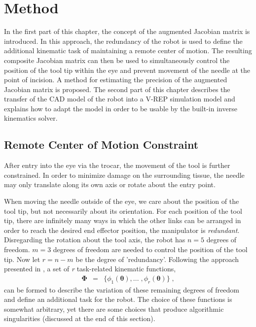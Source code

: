 \chapter{Method}
In the first part of this chapter, the concept of the augmented Jacobian matrix is introduced. In this approach, the redundancy of the robot is used to define the additional kinematic task of maintaining a remote center of motion. The resulting composite Jacobian matrix can then be used to simultaneously control the position of the tool tip within the eye and prevent movement of the needle at the point of incision. A method for estimating the precision of the augmented Jacobian matrix is proposed. The second part of this chapter describes the transfer of the CAD model of the robot into a V-REP simulation model and explains how to adapt the model in order to be usable by the built-in inverse kinematics solver. 

\section{Remote Center of Motion Constraint}
After entry into the eye via the trocar, the movement of the tool is further constrained. In order to minimize damage on the surrounding tissue, the needle may only translate along its own axis or rotate about the entry point.

When moving the needle outside of the eye, we care about the position of the tool tip, but not necessarily about its orientation. For each position of the tool tip, there are infinitely many ways in which the other links can be arranged in order to reach the desired end effector position, the manipulator is \textit{redundant}.
Disregarding the rotation about the tool axis, the robot has $n=5$ degrees of freedom. $m=3$ degrees of freedom are needed to control the position of the tool tip. Now let $r=n-m$ be the degree of 'redundancy'. Following the approach presented in \cite{augmentedJacobian}, a set of \textit{r} task-related kinematic functions,
\begin{eqnarray}
	\bm{\Phi} &=& \{\phi_1(\bm{\theta}),...\; ,\phi_r(\bm{\theta})\} \; ,
\end{eqnarray}
can be formed to describe the variation of these remaining degrees of freedom and define an additional task for the robot. The choice of these functions is somewhat arbitrary, yet there are some choices that produce algorithmic singularities (discussed at the end of this section).

